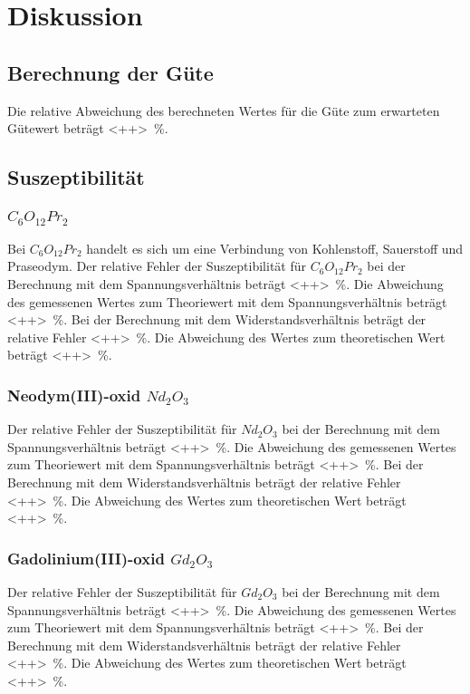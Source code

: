 \section{Diskussion}
\label{sec:Diskussion}

\subsection{Berechnung der Güte}
Die relative Abweichung des berechneten Wertes für die Güte zum erwarteten Gütewert beträgt \SI{<++>}{\percent}. 

\subsection{Suszeptibilität}
\subsubsection{$C_6 O_{12} Pr_2$}
Bei $C_6 O_{12} Pr_2$ handelt es sich um eine Verbindung von Kohlenstoff, Sauerstoff und Praseodym.
\newline
Der relative Fehler der Suszeptibilität für $C_6 O_{12} Pr_2$ bei der Berechnung mit dem Spannungsverhältnis beträgt \SI{<++>}{\percent}. 
Die Abweichung des gemessenen Wertes zum Theoriewert mit dem Spannungsverhältnis beträgt \SI{<++>}{\percent}.
\newline
Bei der Berechnung mit dem Widerstandsverhältnis beträgt der relative Fehler \SI{<++>}{\percent}.
Die Abweichung des Wertes zum theoretischen Wert beträgt \SI{<++>}{\percent}. 

\subsubsection{Neodym(III)-oxid $Nd_2 O_3$}
Der relative Fehler der Suszeptibilität für $Nd_2 O_3$ bei der Berechnung mit dem Spannungsverhältnis beträgt \SI{<++>}{\percent}. 
Die Abweichung des gemessenen Wertes zum Theoriewert mit dem Spannungsverhältnis beträgt \SI{<++>}{\percent}.
\newline
Bei der Berechnung mit dem Widerstandsverhältnis beträgt der relative Fehler \SI{<++>}{\percent}.
Die Abweichung des Wertes zum theoretischen Wert beträgt \SI{<++>}{\percent}.

\subsubsection{Gadolinium(III)-oxid $Gd_2 O_3$}
Der relative Fehler der Suszeptibilität für $Gd_2 O_3$ bei der Berechnung mit dem Spannungsverhältnis beträgt \SI{<++>}{\percent}. 
Die Abweichung des gemessenen Wertes zum Theoriewert mit dem Spannungsverhältnis beträgt \SI{<++>}{\percent}.
\newline
Bei der Berechnung mit dem Widerstandsverhältnis beträgt der relative Fehler \SI{<++>}{\percent}.
Die Abweichung des Wertes zum theoretischen Wert beträgt \SI{<++>}{\percent}.

